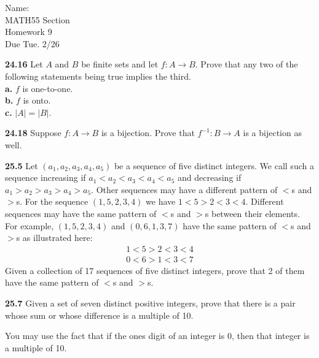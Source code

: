 \documentclass[10pt]{article}
\begin{document}
\begin{flushright}
	Name: \underline{\hspace{3cm}} \\
	MATH55 Section \underline{\hspace{0.5cm}} \\
	Homework 9 \\
	Due Tue. 2/26
\end{flushright}


\begin{framed}
	\textbf{24.16} Let $A$ and $B$ be finite sets and let $f : A \rightarrow B$. 
	Prove that any two of the following statements being true implies the third.\\
	\indent \textbf{a.} $f$ is one-to-one.\\
	\indent \textbf{b.} $f$ is onto.\\
	\indent \textbf{c.} $|A| = |B|$.
\end{framed}

\pagebreak

\begin{framed}
	\textbf{24.18} Suppose $f :A \rightarrow B$ is a bijection.
	Prove that $f^{-1} : B \rightarrow A$ is a bijection as well.
\end{framed}

\pagebreak

\begin{framed}
	\textbf{25.5} Let $(a_1,a_2,a_3,a_4,a_5)$ be a sequence of five distinct integers.
	We call such a sequence increasing if $a_1 <a_2 <a_3 <a_4 <a_5$ and decreasing if
	$a_1 >a_2 >a_3 >a_4 > a_5$. 
	Other sequences may have a different pattern of $<$s and $>$s. 
	For the sequence $(1,5,2,3,4)$ we have $1 < 5 > 2 < 3 < 4$. 
	Different sequences may have the same pattern of $<$s and $>$s between their elements.
	For example, $(1, 5, 2, 3, 4)$ and $(0, 6, 1, 3, 7)$ have the same pattern of $<$s and 
	$>$s as illustrated here:
	\begin{align*}
		1 < 5 > 2 < 3 < 4\\
		0 < 6 > 1 < 3 < 7
	\end{align*}
	Given a collection of 17 sequences of five distinct integers, prove that 2 of them have
	the same pattern of $<$s and $>$s.
\end{framed}

\pagebreak

\begin{framed}
	\textbf{25.7} Given a set of seven distinct positive integers, 
	prove that there is a pair whose sum or whose difference is a multiple of 10.

	You may use the fact that if the ones digit of an integer is 0, then that integer 
	is a multiple of 10.
\end{framed}
\end{document}
